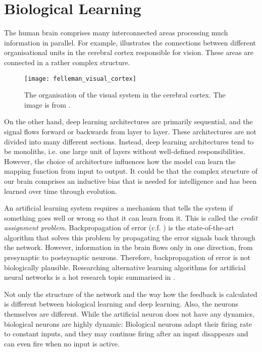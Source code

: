 \section{Biological Learning}
The human brain comprises many interconnected areas processing much information in parallel.
For example,  illustrates the connections between different organisational units in the cerebral cortex responsible for vision.
These areas are connected in a rather complex structure.
\begin{figure}[h]
    \centering
    \texttt{[image: felleman\_visual\_cortex]}
    \caption[Organization of the visual system in the cerebral cortex]{The organisation of the visual system in the cerebral cortex. The image is from .}
\end{figure}
On the other hand, deep learning architectures are primarily sequential, and the signal flows forward or backwards from layer to layer.
These architectures are not divided into many different sections. Instead, deep learning architectures tend to be monoliths, i.e. one large unit of layers without well-defined responsibilities.
However, the choice of architecture influences how the model can learn the mapping function from input to output.
It could be that the complex structure of our brain comprises an inductive bias that is needed for intelligence and has been learned over time through evolution.

An artificial learning system requires a mechanism that tells the system if something goes well or wrong so that it can learn from it.
This is called the \emph{credit assignment problem}.
Backpropagation of error (c.f. ) is the state-of-the-art algorithm that solves this problem by propagating the error signals back through the network.
However, information in the brain flows only in one direction, from presynaptic to postsynaptic neurons.
Therefore, backpropagation of error is not biologically plausible.
Researching alternative learning algorithms for artificial neural networks is a hot research topic summarised in .

Not only the structure of the network and the way how the feedback is calculated is different between biological learning and deep learning.
Also, the neurons themselves are different.
While the artificial neuron does not have any dynamics, biological neurons are highly dynamic:
Biological neurons adapt their firing rate to constant inputs, and they may continue firing after an input disappears and can even fire when no input is active.

